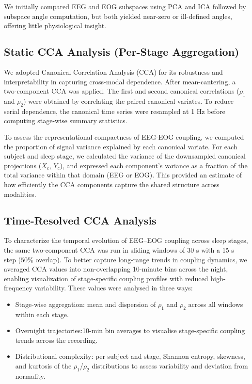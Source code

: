 We initially compared EEG and EOG subspaces using PCA and ICA followed by subspace angle computation, but both yielded near-zero or ill-defined angles, offering little physiological insight. 

\subsection{Static CCA Analysis (Per-Stage Aggregation)}

We adopted Canonical Correlation Analysis (CCA) for its robustness and interpretability in capturing cross-modal dependence. After mean-cantering, a two-component CCA was applied. The first and second canonical correlations ($\rho_1$ and $\rho_2$) were obtained by correlating the paired canonical variates. To reduce serial dependence, the canonical time series were resampled at 1 Hz before computing stage-wise summary statistics.

To assess the representational compactness of EEG-EOG coupling, we computed the proportion of signal variance explained by each canonical variate. For each subject and sleep stage, we calculated the variance of the downsampled canonical projections ($X_c$, $Y_c$), and expressed each component's variance as a fraction of the total variance within that domain (EEG or EOG). This provided an estimate of how efficiently the CCA components capture the shared structure across modalities.

\subsection{Time-Resolved CCA Analysis}

To characterize the temporal evolution of EEG–EOG coupling across sleep stages, the same two-component CCA was run in sliding windows of 30 s with a 15 s step ($50\%$ overlap). To better capture long-range trends in coupling dynamics, we averaged CCA values into non-overlapping 10-minute bins across the night, enabling visualization of stage-specific coupling profiles with reduced high-frequency variability.
These values were analysed in three ways:
\begin{itemize}
    \item Stage-wise aggregation: mean and dispersion of $\rho_1$ and $\rho_2$ across all windows within each stage.
    \item Overnight trajectories:10-min bin averages to visualise stage-specific coupling trends across the recording.
    \item Distributional complexity: per subject and stage, Shannon entropy, skewness, and kurtosis of the $\rho_1$/$\rho_2$ distributions to assess variability and deviation from normality.
\end{itemize}

